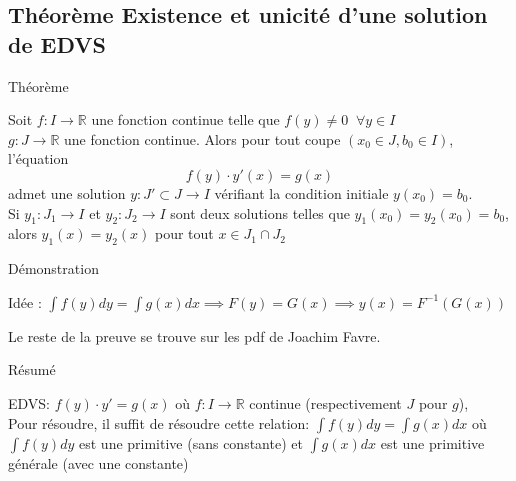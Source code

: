 \subsection{Théorème Existence et unicité d'une solution de EDVS}
\begin{parag}{Théorème}
    \begin{theoreme}
        Soit $f: I \to \mathbb{R}$ une fonction continue telle que $f(y) \neq 0 \; \; \forall y \in I$
        \\
        $g : J \to \mathbb{R}$ une fonction continue. Alors pour tout coupe $(x_0 \in J, b_0 \in I)$, l'équation
        \[f(y)\cdot y'(x) = g(x)\]
        admet une solution $y : J' \subset J \to I$ vérifiant la condition initiale $y(x_0) = b_0$.
        \\
        Si $y_1: J_1 \to I $ et $y_2 : J_2 \to I$ sont deux solutions telles que $y_1(x_0) = y_2(x_0) = b_0$, alors $y_1 (x) = y_2(x)$ pour tout $x \in J_1 \cap J_2$
    \end{theoreme}
\end{parag}
\begin{parag}{Démonstration}
    \begin{framedremark}
        Idée : $\int f(y)dy = \int g(x)dx \implies F(y) = G(x) \implies y(x) = F^{-1}(G(x))$
    \end{framedremark}
    Le reste de la preuve se trouve sur les pdf de Joachim Favre.
\end{parag}
\begin{parag}{Résumé}
\begin{resume}
        EDVS:
        $f(y)\cdot y' = g(x)$ où $f: I \to \mathbb{R}$ continue (respectivement $J$ pour $g$), 
        \\
        Pour résoudre, il suffit de résoudre cette relation: $\int f(y)dy = \int g(x)dx$
        où $\int f(y)dy$ est une primitive (sans constante) et $\int g(x)dx$ est une primitive générale (avec une constante)
    \end{resume}    
\end{parag}
